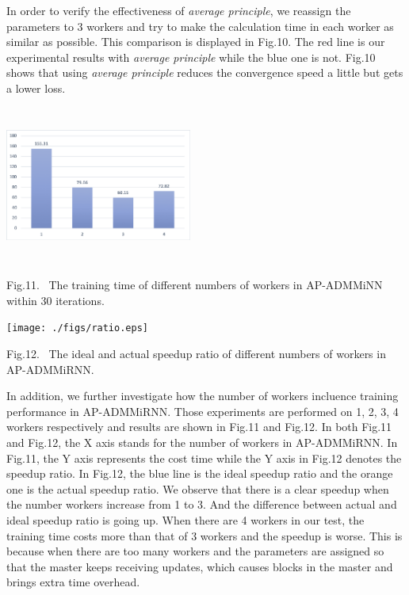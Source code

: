 \documentclass[twoside]{article}
\begin{document}
\begin{multicols}{2}
In order to verify the effectiveness of \textit{average principle}, we reassign the parameters to 3 workers and try to make the calculation time in each worker as similar as possible. This comparison is displayed in Fig.10. The red line is our experimental results with \textit{average principle} while the blue one is not. Fig.10 shows that using \textit{average principle} reduces the convergence speed a little but gets a lower loss. 
\begin{center}
\includegraphics[width=0.46\textwidth, height=14em]{./figs/time.eps}\\
\vspace{2mm}
\parbox[c]{8.3cm}{\footnotesize{Fig.11.~}  The training time of different numbers of workers in AP-ADMMiNN within 30 iterations.}%
\label{fig:multi time}
\end{center}
\begin{center}
\texttt{[image: ./figs/ratio.eps]}\\
\vspace{2mm}
\parbox[c]{8.3cm}{\footnotesize{Fig.12.~}  The ideal and actual speedup ratio of different numbers of workers in AP-ADMMiRNN.}%
\label{fig:ratio}
\end{center}
In addition, we further investigate how the number of workers incluence training performance in AP-ADMMiRNN. Those experiments are performed on 1, 2, 3, 4 workers respectively and results are shown in Fig.11 and Fig.12. In both Fig.11 and Fig.12, the X axis stands for the number of workers in AP-ADMMiRNN. In Fig.11, the Y axis represents the cost time while the Y axis in Fig.12 denotes the speedup ratio. In Fig.12, the blue line is the ideal speedup ratio and the orange one is the actual speedup ratio.
We observe that there is a clear speedup when the number workers increase from 1 to 3. And the difference between actual and ideal speedup ratio is going up. 
When there are 4 workers in our test, the training time costs more than that of 3 workers and the speedup is worse. This is because when there are too many workers and the parameters are assigned so that the master keeps receiving updates, which causes blocks in the master and brings extra time overhead.  


\end{multicols}
\end{document}
